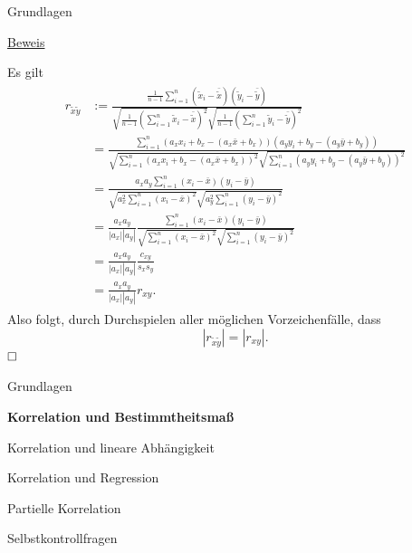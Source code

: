 \documentclass[
  8pt,
  ignorenonframetext,
]{beamer}
\begin{document}
\begin{frame}{Grundlagen}
\protect\hypertarget{grundlagen-9}{}
\footnotesize
\vspace{1mm}

\underline{Beweis}

Es gilt \tiny \begin{align}
\begin{split}
r_{\tilde{x}\tilde{y}} 
& := \frac{\frac{1}{n-1}\sum_{i=1}^n (\tilde{x}_i - \bar{\tilde{x}})(\tilde{y}_i - \bar{\tilde{y}})}
        {\sqrt{\frac{1}{n-1}(\sum_{i=1}^n\tilde{x}_i - \bar{\tilde{x}})^2} \sqrt{\frac{1}{n-1}(\sum_{i=1}^n\tilde{y}_i - \bar{\tilde{y}})^2}}
\\
&  = \frac{\sum_{i=1}^n (a_x x_i + b_x - (a_x\bar{x} + b_x))(a_y y_i + b_y - (a_y \bar{y} + b_y))}
          {\sqrt{\sum_{i=1}^n (a_x x_i + b_x - (a_x \bar{x} + b_x))^2}\sqrt{\sum_{i=1}^n (a_y y_i + b_y - (a_y \bar{y} + b_y))^2}}
\\
&  = \frac{a_x a_y\sum_{i=1}^n (x_i-\bar{x})(y_i-\bar{y})}
          {\sqrt{a_x^2\sum_{i=1}^n (x_i  - \bar{x})^2}\sqrt{a_y^2\sum_{i=1}^n (y_i - \bar{y})^2}}
\\
&  = \frac{a_x a_y}{|a_x||a_y|}
     \frac{\sum_{i=1}^n (x_i-\bar{x})(y_i-\bar{y})}
          {\sqrt{\sum_{i=1}^n (x_i  - \bar{x})^2}\sqrt{\sum_{i=1}^n (y_i - \bar{y})^2}}
\\
&  = \frac{a_x a_y}{|a_x||a_y|}\frac{c_{xy}}{s_x s_y}
\\
&  = \frac{a_x a_y}{|a_x||a_y|}r_{xy}.
\end{split}
\end{align} \footnotesize Also folgt, durch Durchspielen aller möglichen
Vorzeichenfälle, dass \begin{equation}
|r_{\tilde{x}\tilde{y}}| = |r_{xy}|.
\end{equation} \(\hfill\Box\)
\end{frame}

\begin{frame}{}
\protect\hypertarget{section-4}{}
\vfill
\large

Grundlagen

\textbf{Korrelation und Bestimmtheitsmaß}

Korrelation und lineare Abhängigkeit

Korrelation und Regression

Partielle Korrelation

Selbstkontrollfragen

\vfill
\end{frame}
\end{document}
